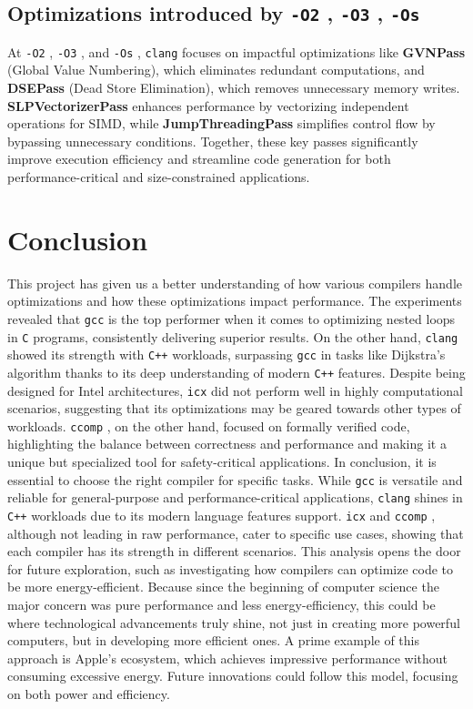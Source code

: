 \documentclass{rapport}
\newcommand{\gcc}{\texttt{gcc} }
\newcommand{\icx}{\texttt{icx} }
\newcommand{\clang}{\texttt{clang} }
\newcommand{\comp}{\texttt{ccomp} }
\newcommand{\optitwo}{\texttt{-O2} }
\newcommand{\optithree}{\texttt{-O3} }
\newcommand{\optisize}{\texttt{-Os} }
\begin{document}
\subsection*{Optimizations introduced by \optitwo, \optithree, \optisize}
At \optitwo, \optithree, and \optisize, \clang focuses on impactful optimizations like \textbf{GVNPass} (Global Value Numbering), which eliminates redundant 
computations, and \textbf{DSEPass} (Dead Store Elimination), which removes unnecessary memory writes. \newline
\textbf{SLPVectorizerPass} enhances performance by vectorizing 
independent operations for SIMD, while \textbf{JumpThreadingPass} simplifies control flow by bypassing unnecessary conditions. Together, these key passes 
significantly improve execution efficiency and streamline code generation for both performance-critical and size-constrained applications.

\section{Conclusion}
This project has given us a better understanding of how various compilers handle optimizations and how these optimizations impact performance. \newline
The experiments revealed that \gcc is the top performer when it comes to optimizing nested loops in \texttt{C} programs, consistently delivering superior results. On the other hand, 
\clang showed its strength with \texttt{C++} workloads, surpassing \gcc in tasks like Dijkstra’s algorithm thanks to its deep understanding of modern \texttt{C++} features.
Despite being designed for Intel architectures, \icx did not perform well in highly computational scenarios, suggesting that its optimizations may be geared towards other types 
of workloads. \comp, on the other hand, focused on formally verified code, highlighting the balance between correctness and performance and making it a unique but specialized tool 
for safety-critical applications.
\newline\newline
In conclusion, it is essential to choose the right compiler for specific tasks. While \gcc is versatile and reliable for general-purpose and performance-critical applications, 
\clang shines in \texttt{C++} workloads due to its modern language features support. \icx and \comp, although not leading in raw performance, cater to specific use cases, showing that 
each compiler has its strength in different scenarios. 
\newline\newline
This analysis opens the door for future exploration, such as investigating how compilers can optimize code to be more energy-efficient. 
Because since the beginning of computer science the major concern was pure performance and less energy-efficiency, this could be where technological advancements truly shine, 
not just in creating more powerful computers, but in developing more efficient ones. 
A prime example of this approach is Apple's ecosystem, which achieves impressive performance without consuming excessive energy. 
Future innovations could follow this model, focusing on both power and efficiency.

\clearpage
\nocite{*}


\end{document}
